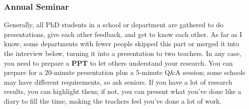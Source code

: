 \subsubsection{Annual Seminar}
Generally, all PhD students in a school or department are gathered to do presentations, give each other feedback, and get to know each other. As far as I know, some departments with fewer people skipped this part or merged it into the interview below, turning it into a presentation to two teachers. In any case, you need to prepare a \textbf{PPT} to let others understand your research. You can prepare for a 20-minute presentation plus a 5-minute Q\&A session; some schools may have different requirements, so ask seniors. If you have a lot of research results, you can highlight them; if not, you can present what you've done like a diary to fill the time, making the teachers feel you've done a lot of work.


